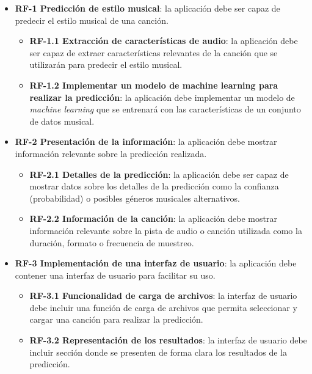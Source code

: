 \begin{itemize}
\tightlist

\item \textbf{RF-1 Predicción de estilo musical}: la aplicación debe ser capaz de predecir el estilo musical de una canción.
	\begin{itemize}
	\tightlist
	\item \textbf{RF-1.1 Extracción de características de audio}: la aplicación debe ser capaz de extraer características relevantes de la canción que se utilizarán para predecir el estilo musical.

	\item \textbf{RF-1.2 Implementar un modelo de machine learning para realizar la predicción}: la aplicación debe implementar un modelo de \emph{machine learning} que se entrenará con las características de un conjunto de datos musical.
	\end{itemize}

\item \textbf{RF-2 Presentación de la información}: la aplicación debe mostrar información relevante sobre la predicción realizada.
	\begin{itemize}
	\tightlist
	\item \textbf{RF-2.1 Detalles de la predicción}: la aplicación debe ser capaz de mostrar datos sobre los detalles de la predicción como la confianza (probabilidad) o posibles géneros musicales alternativos.

	\item \textbf{RF-2.2 Información de la canción}: la aplicación debe mostrar información relevante sobre la pista de audio o canción utilizada como la duración, formato o frecuencia de muestreo.
	\end{itemize}
\item \textbf{RF-3 Implementación de una interfaz de usuario}: la aplicación debe contener una interfaz de usuario para facilitar su uso.
	\begin{itemize}
	\tightlist
	\item \textbf{RF-3.1 Funcionalidad de carga de archivos}: la interfaz de usuario debe incluir una función de carga de archivos que permita seleccionar y cargar una canción para realizar la predicción.

	\item \textbf{RF-3.2 Representación de los resultados}: la interfaz de usuario debe incluir sección donde se presenten de forma clara los resultados de la predicción.
	\end{itemize}

\end{itemize}
